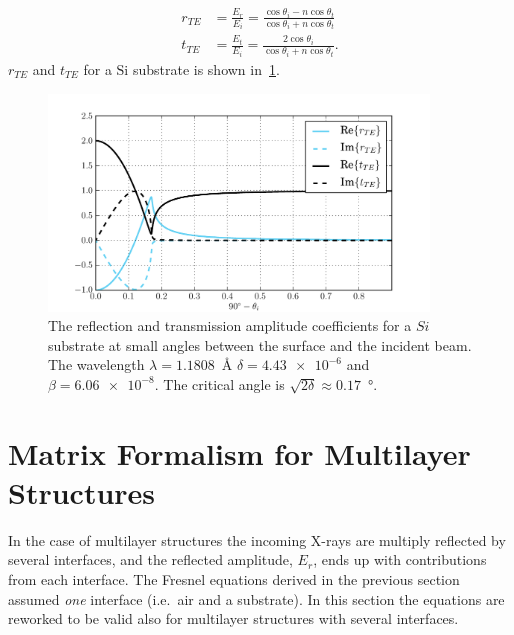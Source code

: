 \documentclass[10pt,twoside, b5paper,pdftex]{report}
\newcommand{\chem}[1]{\ensuremath{\mathrm{#1}}}
\begin{document}
\begin{subequations}
\begin{align}
r_{TE} &= \frac{E_{r}}{E_{i}} = \frac{\cos{\theta_{i}} - n\cos{\theta_{t}}}{\cos{\theta_{i}} + n\cos{\theta_{t}}} \label{eq:rTE} \\
t_{TE} &= \frac{E_{t}}{E_{i}} = \frac{2 \cos{\theta_{i}}}{\cos{\theta_{i}} + n\cos{\theta_{t}}}. \label{eq:tTE}
\end{align}
\end{subequations}
%
$r_{TE}$ and $t_{TE}$ for a \chem{Si} substrate  is shown in~\cref{fig:RT}.
\begin{figure}[htbp]
	\begin{center}
		\includegraphics[width=0.9\textwidth]{figures/RT.pdf}		
	\end{center}
	\caption{The reflection and transmission amplitude coefficients for a $Si$ substrate at small angles between the surface and the incident beam.  The wavelength $\lambda = 1.1808$~\si{\angstrom} $\delta = \num{4.43e-6}$ and $\beta = \num{6.06e-8}$. The critical angle is $\sqrt{2\delta} \approx 0.17$~\si{\degree}. \label{fig:RT}}
\end{figure}




\section{Matrix Formalism for Multilayer Structures \label{sec:mxm}}
In the case of multilayer structures the incoming X-rays are multiply reflected by several interfaces, and the reflected amplitude, $E_{r}$, ends up with contributions from each interface. The Fresnel equations derived in the previous section assumed {\it one} interface (i.e.~air and a substrate). In this section the equations are reworked to be valid also for multilayer structures with several interfaces. %
\end{document}
